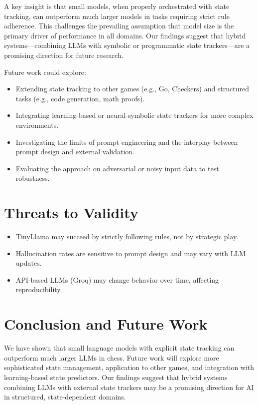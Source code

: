 \documentclass[conference]{IEEEtran}
\begin{document}
A key insight is that small models, when properly orchestrated with state tracking, can outperform much larger models in tasks requiring strict rule adherence. This challenges the prevailing assumption that model size is the primary driver of performance in all domains. Our findings suggest that hybrid systems—combining LLMs with symbolic or programmatic state trackers—are a promising direction for future research.

Future work could explore:
\begin{itemize}
    \item Extending state tracking to other games (e.g., Go, Checkers) and structured tasks (e.g., code generation, math proofs).
    \item Integrating learning-based or neural-symbolic state trackers for more complex environments.
    \item Investigating the limits of prompt engineering and the interplay between prompt design and external validation.
    \item Evaluating the approach on adversarial or noisy input data to test robustness.
\end{itemize}

\section{Threats to Validity}
\begin{itemize}
    \item TinyLlama may succeed by strictly following rules, not by strategic play.
    \item Hallucination rates are sensitive to prompt design and may vary with LLM updates.
    \item API-based LLMs (Groq) may change behavior over time, affecting reproducibility.
\end{itemize}

\section{Conclusion and Future Work}
We have shown that small language models with explicit state tracking can outperform much larger LLMs in chess. Future work will explore more sophisticated state management, application to other games, and integration with learning-based state predictors. Our findings suggest that hybrid systems combining LLMs with external state trackers may be a promising direction for AI in structured, state-dependent domains.
\end{document}
